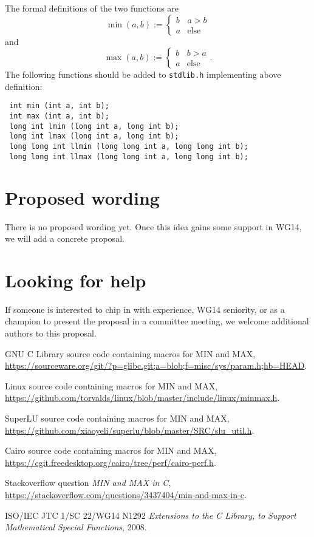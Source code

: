 \documentclass[a4paper,10pt]{scrartcl}
\begin{document}
The formal definitions of the two functions are
\begin{equation*}
 \operatorname{min}(a, b) := \begin{cases}b & a > b\\ a & \text{else}\end{cases}
\end{equation*}
and
\begin{equation*}
 \operatorname{max}(a, b) := \begin{cases}b & b > a\\ a & \text{else}\end{cases}.
\end{equation*}
The following functions should be added to \lstinline{stdlib.h} implementing above definition:
\begin{lstlisting}
 int min (int a, int b);
 int max (int a, int b);
 long int lmin (long int a, long int b);
 long int lmax (long int a, long int b);
 long long int llmin (long long int a, long long int b);
 long long int llmax (long long int a, long long int b);
\end{lstlisting}


\section{Proposed wording}
There is no proposed wording yet. Once this idea gains some support in WG14, we will add a concrete proposal.

\section{Looking for help}
If someone is interested to chip in with experience, WG14 seniority, or as a champion to present the proposal in a committee meeting, we welcome additional authors to this proposal.

\begin{thebibliography}{9}
GNU C Library source code containing macros for MIN and MAX, \url{https://sourceware.org/git/?p=glibc.git;a=blob;f=misc/sys/param.h;hb=HEAD}.

Linux source code containing macros for MIN and MAX, \url{https://github.com/torvalds/linux/blob/master/include/linux/minmax.h}.

SuperLU source code containing macros for MIN and MAX,\\ \url{https://github.com/xiaoyeli/superlu/blob/master/SRC/slu_util.h}.

Cairo source code containing macros for MIN and MAX,\\ \url{https://cgit.freedesktop.org/cairo/tree/perf/cairo-perf.h}.

Stackoverflow question \emph{MIN and MAX in C},\\ \url{https://stackoverflow.com/questions/3437404/min-and-max-in-c}.

ISO/IEC JTC 1/SC 22/WG14 N1292 \emph{Extensions to the C Library, to Support Mathematical Special Functions}, 2008.
\end{thebibliography}
\end{document}
